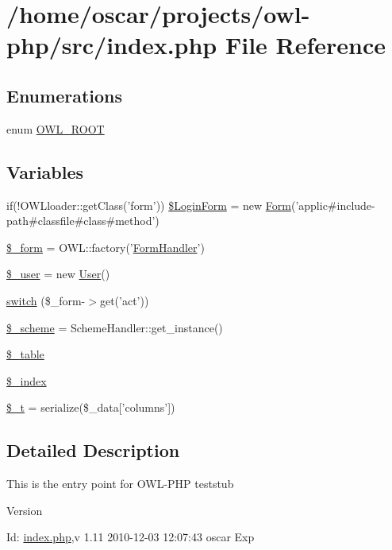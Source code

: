 \section{/home/oscar/projects/owl-\/php/src/index.php File Reference}
\label{index_8php}
\subsection*{Enumerations}
\begin{DoxyCompactItemize}
\item 
enum \hyperlink{index_8php_a35612f9a6bd7277982731a74593272c4}{OWL\_\-ROOT} 
\end{DoxyCompactItemize}
\subsection*{Variables}
\begin{DoxyCompactItemize}
\item 
if(!OWLloader::getClass('form')) \hyperlink{index_8php_ae89d28a5f6ccd73a8cb4a0253db78766}{\$LoginForm} = new \hyperlink{classForm}{Form}('applic\#include-\/path\#classfile\#class\#method')
\item 
\hyperlink{index_8php_ab14b242803551e0f269742a7103f149d}{\$\_\-form} = OWL::factory('\hyperlink{classFormHandler}{FormHandler}')
\item 
\hyperlink{index_8php_a5df5982b9dadc74df05081972cd67fdf}{\$\_\-user} = new \hyperlink{classUser}{User}()
\item 
\hyperlink{index_8php_aa284f7d5270c1aa684d885f7bb70d532}{switch} (\$\_\-form-\/$>$get('act'))
\item 
\hyperlink{index_8php_abb5321c25f21f089f5c253d5f2697502}{\$\_\-scheme} = SchemeHandler::get\_\-instance()
\item 
\hyperlink{index_8php_ac0ee5b766d19cb282552a3449a1f8376}{\$\_\-table}
\item 
\hyperlink{index_8php_a8fba9293fc0e3b428610c8208c00297d}{\$\_\-index}
\item 
\hyperlink{index_8php_a7a22c26026cc0626b015085e752b45cb}{\$\_\-t} = serialize(\$\_\-data\mbox{[}'columns'\mbox{]})
\end{DoxyCompactItemize}


\subsection{Detailed Description}
This is the entry point for OWL-\/PHP teststub \begin{DoxyVersion}{Version}

\end{DoxyVersion}
\begin{DoxyParagraph}{Id:}
\hyperlink{index_8php}{index.php},v 1.11 2010-\/12-\/03 12:07:43 oscar Exp 
\end{DoxyParagraph}


